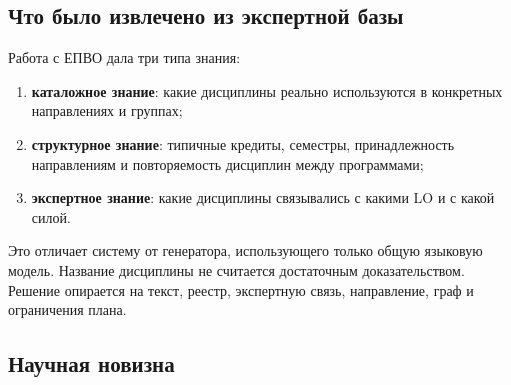 \documentclass[twoside,11pt]{article}
\begin{document}
\subsection{Что было извлечено из экспертной базы}

Работа с ЕПВО дала три типа знания:
\begin{enumerate}
  \item \textbf{каталожное знание}: какие дисциплины реально используются в конкретных направлениях и группах;
  \item \textbf{структурное знание}: типичные кредиты, семестры, принадлежность направлениям и повторяемость дисциплин между программами;
  \item \textbf{экспертное знание}: какие дисциплины связывались с какими LO и с какой силой.
\end{enumerate}

Это отличает систему от генератора, использующего только общую языковую модель. Название дисциплины не считается достаточным доказательством. Решение опирается на текст, реестр, экспертную связь, направление, граф и ограничения плана.

\subsection{Научная новизна}
\end{document}
